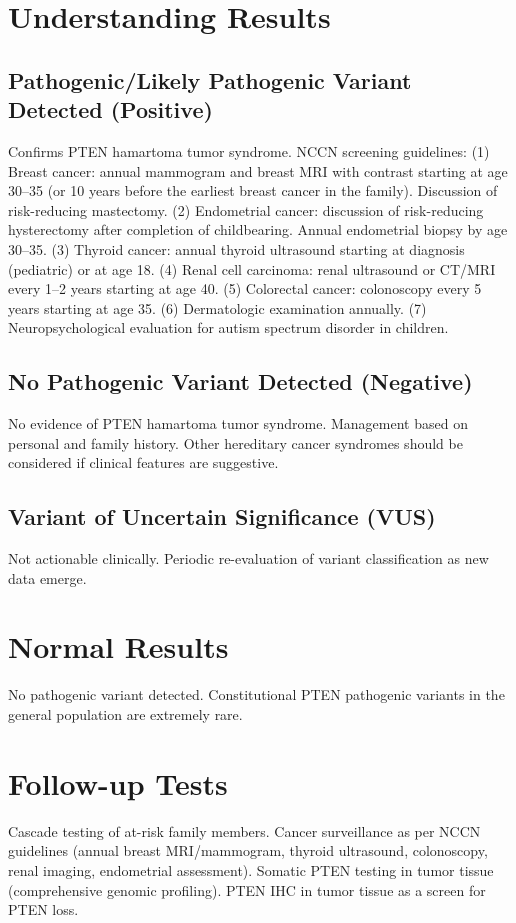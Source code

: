 \section*{Understanding Results}

\subsection*{Pathogenic/Likely Pathogenic Variant Detected (Positive)}
Confirms PTEN hamartoma tumor syndrome. NCCN screening guidelines: (1) Breast cancer: annual mammogram and breast MRI with contrast starting at age 30--35 (or 10 years before the earliest breast cancer in the family). Discussion of risk-reducing mastectomy. (2) Endometrial cancer: discussion of risk-reducing hysterectomy after completion of childbearing. Annual endometrial biopsy by age 30--35. (3) Thyroid cancer: annual thyroid ultrasound starting at diagnosis (pediatric) or at age 18. (4) Renal cell carcinoma: renal ultrasound or CT/MRI every 1--2 years starting at age 40. (5) Colorectal cancer: colonoscopy every 5 years starting at age 35. (6) Dermatologic examination annually. (7) Neuropsychological evaluation for autism spectrum disorder in children.

\subsection*{No Pathogenic Variant Detected (Negative)}
No evidence of PTEN hamartoma tumor syndrome. Management based on personal and family history. Other hereditary cancer syndromes should be considered if clinical features are suggestive.

\subsection*{Variant of Uncertain Significance (VUS)}
Not actionable clinically. Periodic re-evaluation of variant classification as new data emerge.

\section*{Normal Results}
No pathogenic variant detected. Constitutional PTEN pathogenic variants in the general population are extremely rare.

\section*{Follow-up Tests}
Cascade testing of at-risk family members. Cancer surveillance as per NCCN guidelines (annual breast MRI/mammogram, thyroid ultrasound, colonoscopy, renal imaging, endometrial assessment). Somatic PTEN testing in tumor tissue (comprehensive genomic profiling). PTEN IHC in tumor tissue as a screen for PTEN loss.

